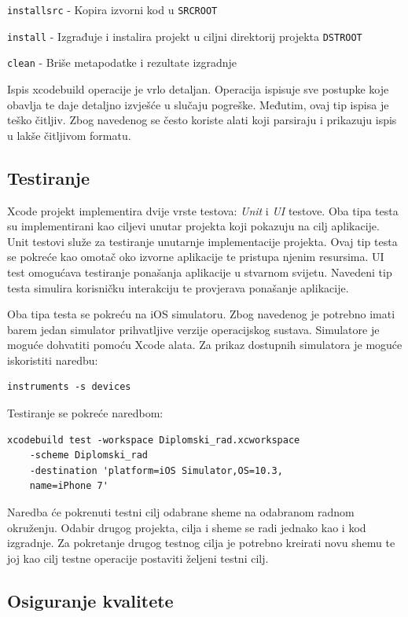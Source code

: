 \documentclass[times, utf8, diplomski, numeric]{fer}
\begin{document}
\begin{appendices}
\verb|installsrc| - Kopira izvorni kod u \verb|SRCROOT|

\verb|install| - Izgrađuje i instalira projekt u ciljni direktorij projekta \verb|DSTROOT|

\verb|clean| - Briše metapodatke i rezultate izgradnje

Ispis xcodebuild operacije je vrlo detaljan. Operacija ispisuje sve postupke koje obavlja te daje detaljno izvješće u slučaju pogreške. Međutim, ovaj tip ispisa je teško čitljiv. Zbog navedenog se često koriste alati koji parsiraju i prikazuju ispis u lakše čitljivom formatu.

\subsection{Testiranje}

Xcode projekt implementira dvije vrste testova: \textit{Unit} i \textit{UI} testove. Oba tipa testa su implementirani kao ciljevi unutar projekta koji pokazuju na cilj aplikacije. Unit testovi služe za testiranje unutarnje implementacije projekta. Ovaj tip testa se pokreće kao omotač oko izvorne aplikacije te pristupa njenim resursima. UI test omogućava testiranje ponašanja aplikacije u stvarnom svijetu. Navedeni tip testa simulira korisničku interakciju te provjerava ponašanje aplikacije.

Oba tipa testa se pokreću na iOS simulatoru. Zbog navedenog je potrebno imati barem jedan simulator prihvatljive verzije operacijskog sustava. Simulatore je moguće dohvatiti pomoću Xcode alata. Za prikaz dostupnih simulatora je moguće iskoristiti naredbu:

\begin{verbatim}
instruments -s devices
\end{verbatim}

Testiranje se pokreće naredbom:

\begin{verbatim}
xcodebuild test -workspace Diplomski_rad.xcworkspace
    -scheme Diplomski_rad
    -destination 'platform=iOS Simulator,OS=10.3,
    name=iPhone 7'
\end{verbatim}

Naredba će pokrenuti testni cilj odabrane sheme na odabranom radnom okruženju. Odabir drugog projekta, cilja i sheme se radi jednako kao i kod izgradnje. Za pokretanje drugog testnog cilja je potrebno kreirati novu shemu te joj kao cilj testne operacije postaviti željeni testni cilj.

\subsection{Osiguranje kvalitete}


\end{appendices}
\end{document}
